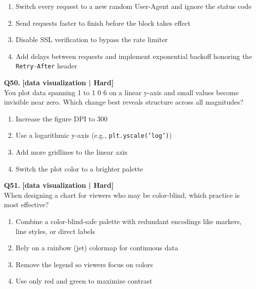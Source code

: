 \begin{enumerate}[label=(\alph*),topsep=2pt,itemsep=1pt,partopsep=0pt,parsep=0pt]
    \item \relax Switch every request to a new random User-Agent and ignore the status code
    \item \relax Send requests faster to finish before the block takes effect
    \item \relax Disable SSL verification to bypass the rate limiter
    \item \relax Add delays between requests and implement exponential backoff honoring the \texttt{Retry-After} header
\end{enumerate}
\vspace{2mm}

\noindent\textbf{Q50.} \hfill {\small\color{LPUOrange}\textbf{[data visualization | Hard]}}\\[2pt]
You plot data spanning 1 to 1 0 6 on a linear y-axis and small values become invisible near zero. Which change best reveals structure across all magnitudes?

\begin{enumerate}[label=(\alph*),topsep=2pt,itemsep=1pt,partopsep=0pt,parsep=0pt]
    \item \relax Increase the figure DPI to 300
    \item \relax Use a logarithmic y-axis (e.g., \texttt{plt.yscale('log')})
    \item \relax Add more gridlines to the linear axis
    \item \relax Switch the plot color to a brighter palette
\end{enumerate}
\vspace{2mm}

\noindent\textbf{Q51.} \hfill {\small\color{LPUOrange}\textbf{[data visualization | Hard]}}\\[2pt]
When designing a chart for viewers who may be color-blind, which practice is most effective?

\begin{enumerate}[label=(\alph*),topsep=2pt,itemsep=1pt,partopsep=0pt,parsep=0pt]
    \item \relax Combine a color-blind-safe palette with redundant encodings like markers, line styles, or direct labels
    \item \relax Rely on a rainbow (jet) colormap for continuous data
    \item \relax Remove the legend so viewers focus on colors
    \item \relax Use only red and green to maximize contrast
\end{enumerate}
\vspace{2mm}

